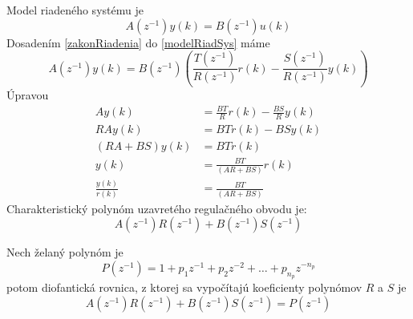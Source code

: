 \documentclass[a4paper, 10pt, ]{article}
\begin{document}
Model riadeného systému je
\begin{equation} \label{modelRiadSys}
	A(z^{-1})y(k)
	=
		B(z^{-1})u(k)
\end{equation}
Dosadením \eqref{zakonRiadenia} do \eqref{modelRiadSys} máme
\begin{equation}
	A(z^{-1})y(k) = B(z^{-1}) \left( \frac{T(z^{-1})}{R(z^{-1})}r(k) - \frac{S(z^{-1})}{R(z^{-1})}y(k) \right)
\end{equation}
Úpravou
\begin{subequations}
	\begin{align}
		A y(k) &= \frac{BT}{R} r(k) - \frac{BS}{R} y(k) \\
		RA y(k) &= BT r(k) - BS y(k)\\
		\left( RA + BS \right) y(k) &= BT r(k) \\
		y(k) &= \frac{BT}{\left( AR + BS \right)} r(k) \\
		\frac{y(k)}{r(k)} &= \frac{BT}{\left( AR + BS \right)}
	\end{align}
\end{subequations}
Charakteristický polynóm uzavretého regulačného obvodu je:
\begin{equation}
	A(z^{-1})R(z^{-1}) + B(z^{-1})S(z^{-1})
\end{equation}


Nech želaný polynóm je
\begin{equation}
	P(z^{-1})  = 1 + p_1z^{-1} + p_2z^{-2} + \ldots +  p_{n_p}z^{-n_p}
\end{equation}
potom diofantická rovnica, z ktorej sa vypočítajú koeficienty polynómov $R$ a $S$ je
\begin{equation} \label{prvaDiofantRovn}
	A(z^{-1})R(z^{-1}) + B(z^{-1})S(z^{-1})  = 	P(z^{-1})
\end{equation}
\end{document}
